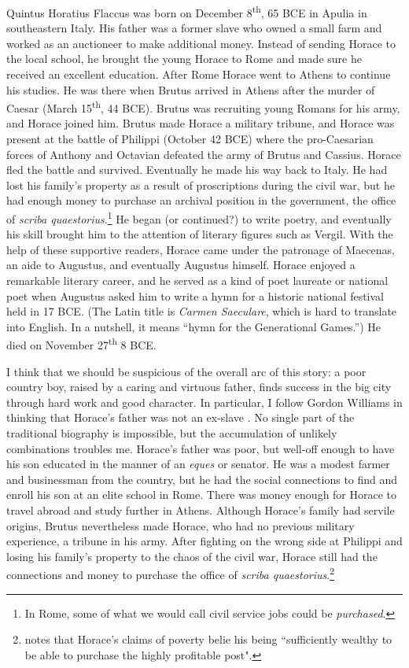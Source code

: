 Quintus Horatius Flaccus was born on December 8\textsuperscript{th}, 65 BCE in Apulia in southeastern Italy.  His father was a former slave who owned a small farm and worked as an auctioneer to make additional money.  Instead of sending Horace to the local school, he brought the young Horace to Rome and made sure he received an excellent education.  After Rome Horace went to Athens to continue his studies.  He was there when Brutus arrived in Athens after the murder of Caesar (March 15\textsuperscript{th}, 44 BCE).  Brutus was recruiting young Romans for his army, and Horace joined him.  Brutus made Horace a military tribune, and Horace was present at the battle of Philippi (October 42 BCE) where the pro-Caesarian forces of Anthony and Octavian defeated the army of Brutus and Cassius.  Horace fled the battle and survived.  Eventually he made his way back to Italy.  He had lost his family's property as a result of proscriptions during the civil war, but he had enough money to purchase an archival position in the government, the office of \textit{scriba quaestorius}.\footnote{In Rome, some of what we would call civil service jobs could be \textit{purchased}.}  He began (or continued?) to write poetry, and eventually his skill brought him to the attention of literary figures such as Vergil.  With the help of these supportive readers, Horace came under the patronage of Maecenas, an aide to Augustus, and eventually Augustus himself.  Horace enjoyed a remarkable literary career, and he served as a kind of poet laureate or national poet when Augustus asked him to write a hymn for a historic national festival held in 17 BCE.  (The Latin title is \textit{Carmen Saeculare}, which is hard to translate into English.  In a nutshell, it means ``hymn for the Generational Games.'')  He died on November 27\textsuperscript{th} 8 BCE.

I think that we should be suspicious of the overall arc of this story: a poor country boy, raised by a caring and virtuous father, finds success in the big city through hard work and good character.  In particular, I follow Gordon Williams in thinking that Horace's father was not an ex-slave \citep{williams1995}.  No single part of the traditional biography is impossible, but the accumulation of unlikely combinations troubles me.  Horace's father was poor, but well-off enough to have his son educated in the manner of an \textit{eques} or senator.  He was a modest farmer and businessman from the country, but he had the social connections to find and enroll his son at an elite school in Rome.  There was money enough for Horace to travel abroad and study further in Athens.  Although Horace's family had servile origins, Brutus nevertheless made Horace, who had no previous military experience, a tribune in his army.  After fighting on the wrong side at Philippi and losing his family's property to the chaos of the civil war, Horace still had the connections and money to purchase the office of \textit{scriba quaestorius}.\footnote{\citet[104]{williams1995} notes that Horace's claims of poverty belie his being ``sufficiently wealthy to be able to purchase the highly profitable post".}

